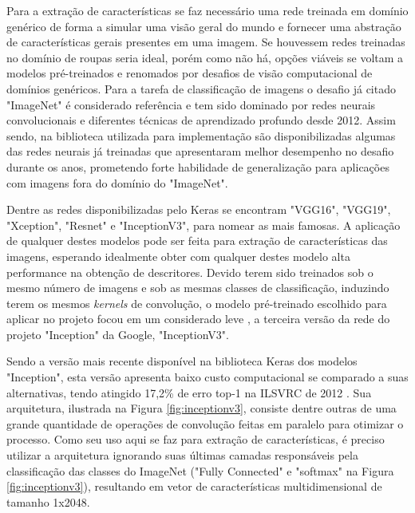 \documentclass[12pt]{report}
\begin{document}
Para a extração de características se faz necessário uma rede treinada em domínio genérico de forma a simular uma visão geral do mundo e fornecer uma abstração de características gerais presentes em uma imagem. Se houvessem redes treinadas no domínio de roupas seria ideal, porém como não há, opções viáveis se voltam a modelos pré-treinados e renomados por desafios de visão computacional de domínios genéricos.  Para a tarefa de classificação de imagens o desafio já citado "ImageNet" é considerado referência \cite{pyimage} e tem sido dominado por redes neurais convolucionais e diferentes técnicas de aprendizado profundo desde 2012. Assim sendo, na biblioteca utilizada para implementação são disponibilizadas algumas das redes neurais já treinadas que apresentaram melhor desempenho no desafio durante os anos, prometendo forte habilidade de generalização para aplicações com imagens fora do domínio do "ImageNet".

Dentre as redes disponibilizadas pelo Keras se encontram "VGG16", "VGG19", "Xception", "Resnet" e "InceptionV3", para nomear as mais famosas. A aplicação de qualquer destes modelos pode ser feita para extração de características das imagens, esperando idealmente obter com qualquer destes modelo alta performance na obtenção de descritores. Devido terem sido treinados sob o mesmo número de imagens e sob as mesmas classes de classificação, induzindo terem os mesmos \textit{kernels} de convolução, o modelo pré-treinado escolhido para aplicar no projeto focou em um considerado leve \cite{pyimage}, a terceira versão da rede do projeto "Inception" da Google, "InceptionV3". 

Sendo a versão mais recente disponível na biblioteca Keras dos modelos "Inception", esta versão apresenta baixo custo computacional se comparado a suas alternativas, tendo atingido 17,2\% de erro top-1 na ILSVRC de 2012 \cite{inceptionv3}. Sua arquitetura, ilustrada na Figura \ref{fig:inceptionv3}, consiste dentre outras de uma grande quantidade de operações de convolução feitas em paralelo para otimizar o processo. Como seu uso aqui se faz para extração de características, é preciso utilizar a arquitetura ignorando suas últimas camadas responsáveis pela classificação das classes do ImageNet ("Fully Connected" e "softmax" na Figura \ref{fig:inceptionv3}), resultando em vetor de características multidimensional de tamanho 1x2048.

\end{document}
